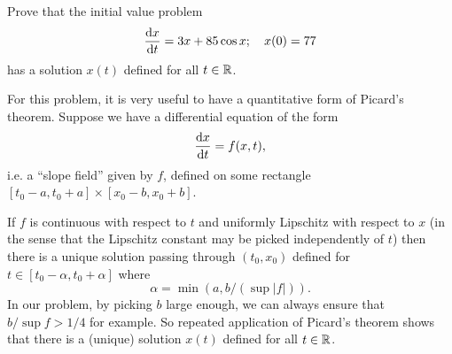 \begin{problem}
	Prove that the initial value problem
	\[
		\deriv[t][x] = 3x + 85 \cos x; \quad x(0)=77
	\]
	has a solution $x(t)$ defined for all $t\in \mathbb{R}$.
\end{problem}
\begin{solution}
	For this problem, it is very useful to have a quantitative form of Picard's theorem. Suppose we have a differential equation of the form
	\[
		\deriv[t][x] = f(x,t),
	\]
	i.e. a ``slope field'' given by $f$, defined on some rectangle $[t_0 - a, t_0 + a] \times [x_0 - b, x_0 + b]$.
	
	If $f$ is continuous with respect to $t$ and uniformly Lipschitz with respect to $x$ (in the sense that the Lipschitz constant may be picked independently of $t$) then there is a unique solution passing through $(t_0, x_0)$ defined for $t\in [t_0 - \alpha, t_0 + \alpha]$ where
	\[
		\alpha = \min(a, b/(\sup |f|)).
	\]
	In our problem, by picking $b$ large enough, we can always ensure that $b/\sup f > 1/4$ for example. So repeated application of Picard's theorem shows that there is a (unique) solution $x(t)$ defined for all $t \in \mathbb{R}$.
\end{solution}

